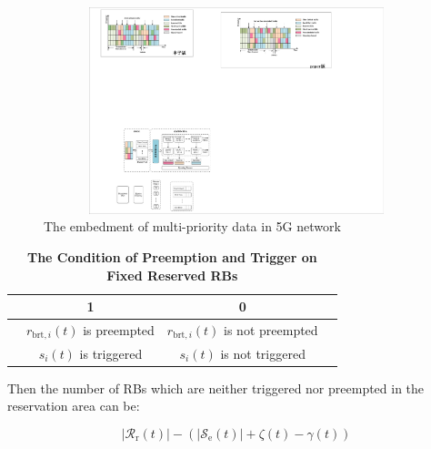 \documentclass{SCIS2021}
\begin{document}
	\begin{figure}[t]
		\flushright
		\includegraphics[height=6cm, width=14cm]{RB}
		\caption{The embedment of multi-priority data in 5G network}
		\label{fig:RBs}
	\end{figure}


	\begin{table}[h]
		\caption{\textbf{The Condition of Preemption and Trigger on Fixed Reserved RBs\label{key}}}
		\label{tal:preemption}
		\label{tab1}
		\tabcolsep 40pt %
		\begin{tabular*}{\textwidth}{cccc}
			\toprule
			\bm{$\gamma_{i}=\zeta_{i} \varphi_{i}$} & \textbf{1} & \textbf{0}  \\\hline
			\bm{$\zeta_{i}$} & $r_{\text{brt},i}(t)$ is preempted & $r_{\text{brt},i}(t)$ is not preempted \\
			\bm{$\varphi_{i}$} & $s_{i}(t)$ is triggered & $s_{i}(t)$ is not triggered \\
			\bottomrule
		\end{tabular*}
	\end{table}


	\par Then the number of RBs which are neither triggered nor preempted in the reservation area can be:

	\setlength\abovedisplayskip{-13pt}
	\begin{center}
		\begin{equation}
			\left|\mathcal{R}_\mathrm{r}(t)\right|-\left(\left|\mathcal{S}_{\mathrm{e}}(t)\right|+\zeta(t)-\gamma(t)\right)
		\end{equation}
	\end{center}
	\setlength\belowdisplayskip{-8pt}
\end{document}
